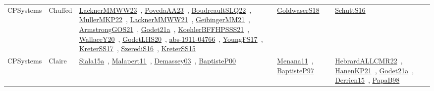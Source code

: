 {\begin{longtable}{lp{3cm}>{\raggedright\arraybackslash}p{6cm}>{\raggedright\arraybackslash}p{6cm}>{\raggedright\arraybackslash}p{8cm}}
CPSystems & Chuffed & \href{works/LacknerMMWW23.pdf}{LacknerMMWW23}~\cite{LacknerMMWW23}, \href{works/PovedaAA23.pdf}{PovedaAA23}~\cite{PovedaAA23}, \href{works/BoudreaultSLQ22.pdf}{BoudreaultSLQ22}~\cite{BoudreaultSLQ22}, \href{works/MullerMKP22.pdf}{MullerMKP22}~\cite{MullerMKP22}, \href{works/LacknerMMWW21.pdf}{LacknerMMWW21}~\cite{LacknerMMWW21}, \href{works/GeibingerMM21.pdf}{GeibingerMM21}~\cite{GeibingerMM21}, \href{works/ArmstrongGOS21.pdf}{ArmstrongGOS21}~\cite{ArmstrongGOS21}, \href{works/Godet21a.pdf}{Godet21a}~\cite{Godet21a}, \href{works/KoehlerBFFHPSSS21.pdf}{KoehlerBFFHPSSS21}~\cite{KoehlerBFFHPSSS21}, \href{works/WallaceY20.pdf}{WallaceY20}~\cite{WallaceY20}, \href{works/GodetLHS20.pdf}{GodetLHS20}~\cite{GodetLHS20}, \href{works/abs-1911-04766.pdf}{abs-1911-04766}~\cite{abs-1911-04766}, \href{works/YoungFS17.pdf}{YoungFS17}~\cite{YoungFS17}, \href{works/KreterSS17.pdf}{KreterSS17}~\cite{KreterSS17}, \href{works/SzerediS16.pdf}{SzerediS16}~\cite{SzerediS16}, \href{works/KreterSS15.pdf}{KreterSS15}~\cite{KreterSS15} & \href{works/GoldwaserS18.pdf}{GoldwaserS18}~\cite{GoldwaserS18} & \href{works/SchuttS16.pdf}{SchuttS16}~\cite{SchuttS16}\\
CPSystems & Claire & \href{works/Siala15a.pdf}{Siala15a}~\cite{Siala15a}, \href{works/Malapert11.pdf}{Malapert11}~\cite{Malapert11}, \href{works/Demassey03.pdf}{Demassey03}~\cite{Demassey03}, \href{works/BaptisteP00.pdf}{BaptisteP00}~\cite{BaptisteP00} & \href{works/Menana11.pdf}{Menana11}~\cite{Menana11}, \href{works/BaptisteP97.pdf}{BaptisteP97}~\cite{BaptisteP97} & \href{works/HebrardALLCMR22.pdf}{HebrardALLCMR22}~\cite{HebrardALLCMR22}, \href{works/HanenKP21.pdf}{HanenKP21}~\cite{HanenKP21}, \href{works/Godet21a.pdf}{Godet21a}~\cite{Godet21a}, \href{works/Derrien15.pdf}{Derrien15}~\cite{Derrien15}, \href{works/PapaB98.pdf}{PapaB98}~\cite{PapaB98}\\

\end{longtable}}
